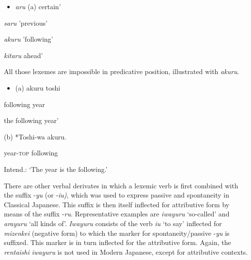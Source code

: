\documentclass[output=paper]{langscibook}
\begin{document}
\begin{itemize}
\item \begin{styleBeispielCinqueKapitel}
\textit{aru} {\textasciigrave}(a) certain'
\end{styleBeispielCinqueKapitel}
\end{itemize}
\begin{styleBeispielCinqueKapitel}
\textit{saru} {}'previous'
\end{styleBeispielCinqueKapitel}

\begin{styleBeispielCinqueKapitel}
\textit{akuru} 'following'
\end{styleBeispielCinqueKapitel}

\begin{styleBeispielCinqueKapitel}
\textit{kitaru} {\textasciigrave}ahead'
\end{styleBeispielCinqueKapitel}

All those lexemes are impossible in predicative position, illustrated with \textit{akuru}.

\begin{itemize}
\item \begin{styleBeispielCinqueKapitel}
(a) akuru toshi
\end{styleBeispielCinqueKapitel}
\end{itemize}
\begin{styleBeispielCinqueKapitel}
following year
\end{styleBeispielCinqueKapitel}

\begin{styleBeispielCinqueKapitel}
{\textasciigrave}the following year'
\end{styleBeispielCinqueKapitel}

\begin{styleBeispielCinqueKapitel}
(b) *Toshi-wa akuru.
\end{styleBeispielCinqueKapitel}

\begin{styleBeispielCinqueKapitel}
year-\textsc{top} following
\end{styleBeispielCinqueKapitel}

\begin{styleBeispielCinqueKapitel}
Intend.: ‘The year is the following.’
\end{styleBeispielCinqueKapitel}

There are other verbal derivates in which a lexemic verb is first combined with the suffix -\textit{yu} (or -\textit{iu)}, which was used to express passive and spontaneity in Classical Japanese. This suffix is then itself inflected for attributive form by means of the suffix -\textit{ru}. Representative examples are \textit{iwayuru} ‘so-called’ and \textit{arayuru} ‘all kinds of’. \textit{Iwayuru} consists of the verb \textit{iu} ‘to say’ inflected for \textit{mizenkei} (negative form) to which the marker for spontaneity/passive -\textit{yu} is suffixed. This marker is in turn inflected for the attributive form. Again, the \textit{rentaishi} \textit{iwayuru} is not used in Modern Japanese, except for attributive contexts.
\end{document}
